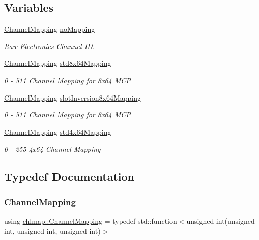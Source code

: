 \subsection*{Variables}
\begin{DoxyCompactItemize}
\item 
\hyperlink{namespacechlmap_aeed247fbd4770834005177ddb2712668}{Channel\+Mapping} \hyperlink{namespacechlmap_adeefba45d9765c580e5f7ef9cb99acc5}{no\+Mapping}
\begin{DoxyCompactList}\small\item\em Raw Electronics Channel ID. \end{DoxyCompactList}\item 
\hyperlink{namespacechlmap_aeed247fbd4770834005177ddb2712668}{Channel\+Mapping} \hyperlink{namespacechlmap_a11d7121de30a32ead9032c59221b7442}{std8x64\+Mapping}
\begin{DoxyCompactList}\small\item\em 0 -\/ 511 Channel Mapping for 8x64 M\+CP \end{DoxyCompactList}\item 
\hyperlink{namespacechlmap_aeed247fbd4770834005177ddb2712668}{Channel\+Mapping} \hyperlink{namespacechlmap_addbd4a4856137809b06e1bffd39e2897}{slot\+Inversion8x64\+Mapping}
\begin{DoxyCompactList}\small\item\em 0 -\/ 511 Channel Mapping for 8x64 M\+CP \end{DoxyCompactList}\item 
\hyperlink{namespacechlmap_aeed247fbd4770834005177ddb2712668}{Channel\+Mapping} \hyperlink{namespacechlmap_a8acaf58562324b3f691a218f08c7afe4}{std4x64\+Mapping}
\begin{DoxyCompactList}\small\item\em 0 -\/ 255 4x64 Channel Mapping \end{DoxyCompactList}\end{DoxyCompactItemize}


\subsection{Typedef Documentation}
\mbox{\label{namespacechlmap_aeed247fbd4770834005177ddb2712668}} 
\subsubsection{\texorpdfstring{Channel\+Mapping}{ChannelMapping}}
{\footnotesize\ttfamily using \hyperlink{namespacechlmap_aeed247fbd4770834005177ddb2712668}{chlmap\+::\+Channel\+Mapping} = typedef std\+::function$<$unsigned int(unsigned int, unsigned int, unsigned int)$>$}



